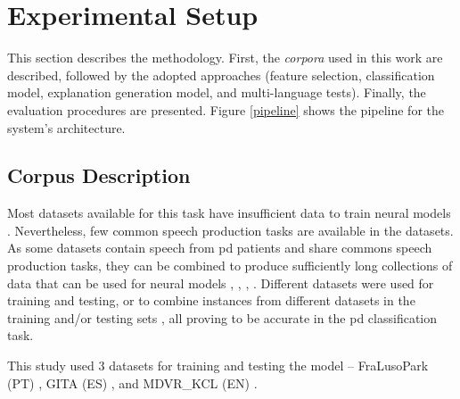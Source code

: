 
\chapter{Experimental Setup}
\label{ch:adipisci}



This section describes the methodology. First, the \textit{corpora} used in this work are described, followed by the adopted approaches (feature selection, classification model, explanation generation model, and multi-language tests). Finally, the evaluation procedures are presented. Figure \ref{pipeline} shows the pipeline for the system's architecture. 

\section{Corpus Description}

Most datasets available for this task have insufficient data to train neural models \cite{underfitting_small_datasets}. Nevertheless, few common speech production tasks are available in the datasets. 
As some datasets contain speech from \gls{pd} patients and share commons speech production tasks, they can be combined to produce sufficiently long collections of data that can be used for neural models \cite{parkinson_braga}, \cite{parkinson_acoustic_despotovic}, \cite{parkinson_phonemic_relevance}, \cite{x_vector_parkinson}. Different datasets were used for training and testing, or to combine instances from different datasets in the training and/or testing sets \cite{parkinson_three_languages}, all proving to be accurate in the \gls{pd} classification task.

This study used 3 datasets for training and testing the model -- FraLusoPark (PT) \cite{fralusopark}, GITA (ES) \cite{GITA}, and MDVR\_KCL (EN) \cite{MDVR}.

